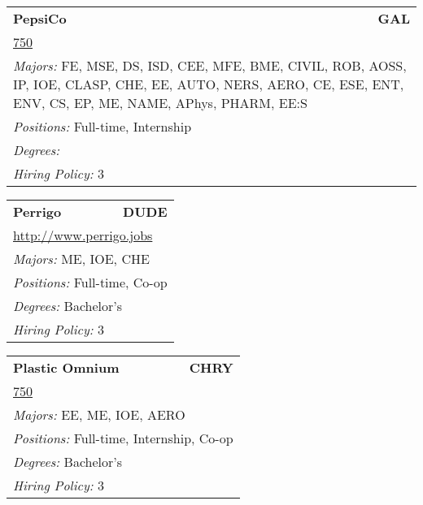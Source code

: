 \documentclass[twoside]{article}
\begin{document}
\begin{center}
\begin{multicols}{3}
\begin{FlushLeft}
\begin{minipage}{\columnwidth}
\end{minipage}
 
\begin{minipage}{\columnwidth}\begin{tabularx}{.95\columnwidth}{Xr}
                 {\Large\bf PepsiCo} & {\Large\bf GAL}\\
    \multicolumn{2}{p{.95\columnwidth}}{\url{750}}\\
    \multicolumn{2}{p{.95\columnwidth}}{\emph{Majors:} FE, MSE, DS, ISD, CEE, MFE, BME, CIVIL, ROB, AOSS, IP, IOE, CLASP, CHE, EE, AUTO, NERS, AERO, CE, ESE, ENT, ENV, CS, EP, ME, NAME, APhys, PHARM, EE:S}\\
    \multicolumn{2}{p{.95\columnwidth}}{\emph{Positions:} Full-time, Internship}\\
    \multicolumn{2}{p{.95\columnwidth}}{\emph{Degrees:} }\\
    \multicolumn{2}{p{.95\columnwidth}}{\emph{Hiring Policy:} 3}\\
    \end{tabularx}
    
\end{minipage}
 
\begin{minipage}{\columnwidth}\begin{tabularx}{.95\columnwidth}{Xr}
                 {\Large\bf Perrigo} & {\Large\bf DUDE}\\
    \multicolumn{2}{p{.95\columnwidth}}{\url{http://www.perrigo.jobs}}\\
    \multicolumn{2}{p{.95\columnwidth}}{\emph{Majors:} ME, IOE, CHE}\\
    \multicolumn{2}{p{.95\columnwidth}}{\emph{Positions:} Full-time, Co-op}\\
    \multicolumn{2}{p{.95\columnwidth}}{\emph{Degrees:} Bachelor's}\\
    \multicolumn{2}{p{.95\columnwidth}}{\emph{Hiring Policy:} 3}\\
    \end{tabularx}
    
\end{minipage}
 
\begin{minipage}{\columnwidth}\begin{tabularx}{.95\columnwidth}{Xr}
                 {\Large\bf Plastic Omnium} & {\Large\bf CHRY}\\
    \multicolumn{2}{p{.95\columnwidth}}{\url{750}}\\
    \multicolumn{2}{p{.95\columnwidth}}{\emph{Majors:} EE, ME, IOE, AERO}\\
    \multicolumn{2}{p{.95\columnwidth}}{\emph{Positions:} Full-time, Internship, Co-op}\\
    \multicolumn{2}{p{.95\columnwidth}}{\emph{Degrees:} Bachelor's}\\
    \multicolumn{2}{p{.95\columnwidth}}{\emph{Hiring Policy:} 3}\\
    \end{tabularx}
    

\end{minipage}
\end{FlushLeft}
\end{multicols}
\end{center}
\end{document}

